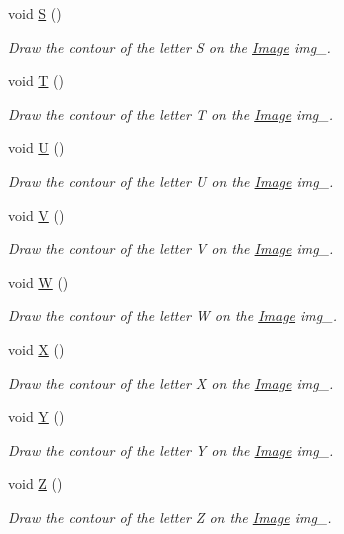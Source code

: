 \begin{DoxyCompactItemize}
void \mbox{\hyperlink{class_font_v1_ab6daa08377051d5af458003c665cfc09}{S}} ()
\begin{DoxyCompactList}\small\item\em Draw the contour of the letter S on the \mbox{\hyperlink{class_image}{Image}} img\+\_\+. \end{DoxyCompactList}\item 
void \mbox{\hyperlink{class_font_v1_ab520e2522e89b6ff20e42621080edd7d}{T}} ()
\begin{DoxyCompactList}\small\item\em Draw the contour of the letter T on the \mbox{\hyperlink{class_image}{Image}} img\+\_\+. \end{DoxyCompactList}\item 
void \mbox{\hyperlink{class_font_v1_a460d625b76b123ba4e67a21091d7dcce}{U}} ()
\begin{DoxyCompactList}\small\item\em Draw the contour of the letter U on the \mbox{\hyperlink{class_image}{Image}} img\+\_\+. \end{DoxyCompactList}\item 
void \mbox{\hyperlink{class_font_v1_aa5937063bd49c25ccd8993d375926fb7}{V}} ()
\begin{DoxyCompactList}\small\item\em Draw the contour of the letter V on the \mbox{\hyperlink{class_image}{Image}} img\+\_\+. \end{DoxyCompactList}\item 
void \mbox{\hyperlink{class_font_v1_aa4e67840b676dfffd3e03d873013174c}{W}} ()
\begin{DoxyCompactList}\small\item\em Draw the contour of the letter W on the \mbox{\hyperlink{class_image}{Image}} img\+\_\+. \end{DoxyCompactList}\item 
void \mbox{\hyperlink{class_font_v1_a8a93144edcf0f9bf1ac9017eb916ff82}{X}} ()
\begin{DoxyCompactList}\small\item\em Draw the contour of the letter X on the \mbox{\hyperlink{class_image}{Image}} img\+\_\+. \end{DoxyCompactList}\item 
void \mbox{\hyperlink{class_font_v1_a25827e105e44581040d8c17cc821e4f3}{Y}} ()
\begin{DoxyCompactList}\small\item\em Draw the contour of the letter Y on the \mbox{\hyperlink{class_image}{Image}} img\+\_\+. \end{DoxyCompactList}\item 
void \mbox{\hyperlink{class_font_v1_a10df574bc5aa14a43988d42db4e89504}{Z}} ()
\begin{DoxyCompactList}\small\item\em Draw the contour of the letter Z on the \mbox{\hyperlink{class_image}{Image}} img\+\_\+. \end{DoxyCompactList}\end{DoxyCompactItemize}
